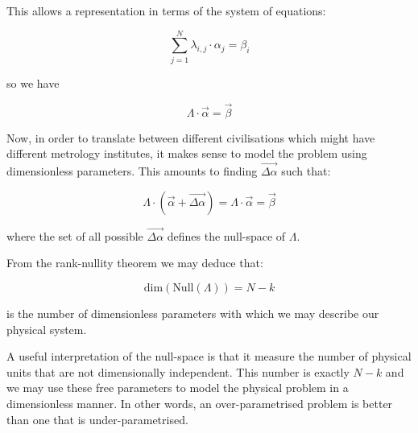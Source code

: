 \documentclass{article}
\begin{document}
This allows a representation in terms of the system of equations:

\begin{equation}
\sum_{j=1}^N \lambda_{i,j} \cdot \alpha_j = \beta_i \tag{4} 
\end{equation}

so we have

\begin{equation}
\Lambda \cdot \vec{\alpha} = \vec{\beta} \tag{5}
\end{equation}

Now, in order to translate between different civilisations which might have different metrology institutes, it makes
sense to model the problem using dimensionless parameters. This amounts to finding $\vec{\Delta \alpha}$ such that:

\begin{equation}
\Lambda \cdot (\vec{\alpha} + \vec{\Delta \alpha}) = \Lambda \cdot \vec{\alpha} = \vec{\beta} \tag{6}
\end{equation}

where the set of all possible $\vec{\Delta \alpha}$ defines the null-space of $\Lambda$.

From the rank-nullity theorem we may deduce that:

\begin{equation}
\text{dim}(\text{Null}(\Lambda)) = N-k \tag{7}
\end{equation}

is the number of dimensionless parameters with which we may describe our physical system.

A useful interpretation of the null-space is that it measure the number of physical units that
are not dimensionally independent. This number is exactly $N-k$ and we may use these free
parameters to model the physical problem in a dimensionless manner. In other words, an over-parametrised problem is better than one that is under-parametrised.
\end{document}
